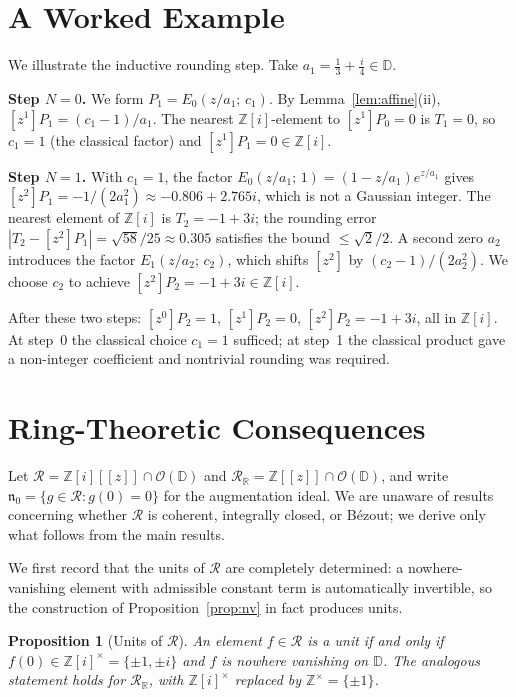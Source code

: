 \documentclass[12pt]{amsart}
\newtheorem{proposition}[theorem]{Proposition}
\theoremstyle{definition}
\newcommand{\D}{\mathbb{D}}
\newcommand{\Z}{\mathbb{Z}}
\newcommand{\Zi}{\mathbb{Z}[i]}
\newcommand{\abs}[1]{\left|#1\right|}
\newcommand{\OD}{\mathcal{O}(\D)}
\newcommand{\mR}{\mathcal{R}}
\newcommand{\mRR}{\mathcal{R}_{\mathbb{R}}}
\begin{document}
\section{A Worked Example}
\label{sec:example}

We illustrate the inductive rounding step.  Take $a_1 = \frac{1}{3} +
\frac{i}{4} \in \D$.

\medskip\noindent\textbf{Step $N=0$.}  We form $P_1 = E_0(z/a_1;\,c_1)$.
By Lemma~\ref{lem:affine}(ii), $[z^1]P_1 = (c_1-1)/a_1$.  The nearest
$\Zi$-element to $[z^1]P_0 = 0$ is $T_1 = 0$, so $c_1 = 1$ (the classical
factor) and $[z^1]P_1 = 0 \in \Zi$.

\medskip\noindent\textbf{Step $N=1$.}  With $c_1 = 1$, the factor
$E_0(z/a_1;\,1) = (1-z/a_1)e^{z/a_1}$ gives $[z^2]P_1 = -1/(2a_1^2)
\approx -0.806 + 2.765i$, which is not a Gaussian integer.
The nearest element of $\Zi$ is $T_2 = -1+3i$; the rounding error
$\abs{T_2 - [z^2]P_1} = \sqrt{58}/25 \approx 0.305$ satisfies the
bound $\leq \sqrt{2}/2$.  A second zero $a_2$ introduces the factor
$E_1(z/a_2;\,c_2)$, which shifts $[z^2]$ by $(c_2-1)/(2a_2^2)$.
We choose $c_2$ to achieve $[z^2]P_2 = -1+3i \in \Zi$.

After these two steps: $[z^0]P_2 = 1$, $[z^1]P_2 = 0$,
$[z^2]P_2 = -1+3i$, all in $\Zi$.  At step~0 the classical choice
$c_1 = 1$ sufficed; at step~1 the classical product gave a non-integer
coefficient and nontrivial rounding was required.

\section{Ring-Theoretic Consequences}
\label{sec:algebra}

Let $\mR = \Zi[[z]] \cap \OD$ and $\mRR = \Z[[z]] \cap \OD$, and write
$\mathfrak{n}_0 = \{g \in \mR : g(0) = 0\}$ for the augmentation ideal.
We are unaware of results concerning whether $\mR$ is coherent, integrally
closed, or Bézout; we derive only what follows from the main results.

We first record that the units of $\mR$ are completely determined: a
nowhere-vanishing element with admissible constant term is automatically
invertible, so the construction of Proposition~\ref{prop:nv} in fact
produces units.

\begin{proposition}[Units of $\mR$]
\label{prop:units}
An element $f \in \mR$ is a unit if and only if $f(0) \in \Zi^\times =
\{\pm 1, \pm i\}$ and $f$ is nowhere vanishing on $\D$.  The analogous
statement holds for $\mRR$, with $\Zi^\times$ replaced by
$\Z^\times = \{\pm 1\}$.
\end{proposition}
\end{document}
